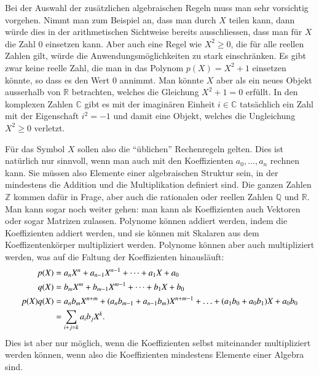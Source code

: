 Bei der Auswahl der zusätzlichen algebraischen Regeln muss man sehr
vorsichtig vorgehen.
Nimmt man zum Beispiel an, dass man durch $X$ teilen kann, dann würde
dies in der arithmetischen Sichtweise bereits ausschliessen, dass man
für $X$ die Zahl $0$ einsetzen kann.
Aber auch eine Regel wie $X^2 \ge 0$, die für alle reellen Zahlen gilt,
würde die Anwendungsmöglichkeiten zu stark einschränken.
Es gibt zwar keine reelle Zahl, die man in das Polynom $p(X)=X^2+1$
einsetzen könnte, so dass es den Wert $0$ annimmt.
Man könnte $X$ aber als ein neues Objekt ausserhalb von $\mathbb{R}$
betrachten, welches die Gleichung $X^2+1=0$ erfüllt.
In den komplexen Zahlen $\mathbb{C}$ gibt es mit der imaginären
Einheit $i\in\mathbb{C}$ tatsächlich ein Zahl mit der Eigenschaft
$i^2=-1$ und damit eine Objekt, welches die Ungleichung $X^2\ge 0$
verletzt.

Für das Symbol $X$ sollen also die ``üblichen'' Rechenregeln gelten.
Dies ist natürlich nur sinnvoll, wenn man auch mit den Koeffizienten
$a_0,\dots,a_n$ rechnen kann.
Sie müssen also Elemente einer
algebraischen Struktur sein, in der mindestens die Addition und die
Multiplikation definiert sind.
Die ganzen Zahlen $\mathbb{Z}$ kommen dafür in Frage, aber auch
die rationalen oder reellen Zahlen $\mathbb{Q}$ und $\mathbb{R}$.
Man kann sogar noch weiter gehen: man kann als Koeffizienten auch
Vektoren oder sogar Matrizen zulassen.
Polynome können addiert werden, indem die Koeffizienten addiert werden,
und sie können mit Skalaren aus dem Koeffizentenkörper multipliziert werden.
Polynome können aber auch multipliziert werden, was auf die Faltung
der Koeffizienten hinausläuft:
\begin{align}
p(X) &= a_nX^n + a_{n-1}X^{n-1} + \dots + a_1X + a_0
\notag
\\
q(X) &= b_mX^m + b_{m-1}X^{m-1} + \dots + b_1X + b_0
\notag
\\
p(X) q(X) &=
a_{n}b_{m}X^{n+m}
+
(a_{n}b_{m-1}+a_{n-1}b_{m})X^{n+m-1}
+
\ldots
+
(a_1b_0+a_0b_1)X
+
a_0b_0
\label{buch:eqn:polynome:faltung}
\\
&=
\sum_{i + j = k}a_ib_j X^k.
\notag
\end{align}
Dies ist aber nur möglich, wenn die Koeffizienten selbst miteinander
multipliziert werden können, wenn also die Koeffizienten mindestens
Elemente einer Algebra sind.



%
%


